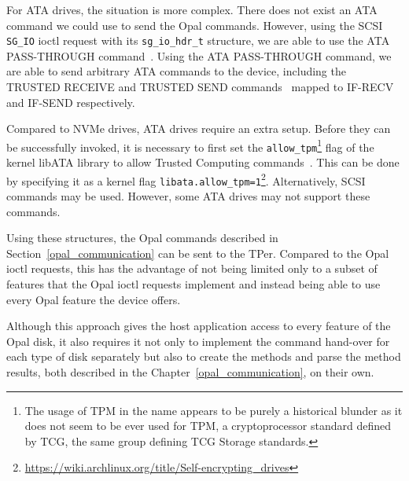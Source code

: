 For ATA drives, the situation is more complex. There does not exist an ATA command we could use to send the Opal commands.
However, using the SCSI \verb|SG_IO| ioctl request with its \verb|sg_io_hdr_t| structure, we are able to use the ATA PASS-THROUGH command~\cite{ata_passthrough}. Using the ATA PASS-THROUGH command, we are able to send arbitrary ATA commands to the device, including the TRUSTED RECEIVE and TRUSTED SEND commands~\cite{acs-3} mapped to IF-RECV and IF-SEND respectively.

Compared to NVMe drives, ATA drives require an extra setup. Before they can be successfully invoked,  it is necessary to first set the \verb|allow_tpm|\footnote{The usage of TPM in the name appears to be purely a historical blunder as it does not seem to be ever used for TPM, a cryptoprocessor standard defined by TCG, the same group defining TCG Storage standards.} flag of the kernel libATA library to allow Trusted Computing commands~\cite{acs-3}. This can be done by specifying it as a kernel flag \verb|libata.allow_tpm=1|\footnote{\url{https://wiki.archlinux.org/title/Self-encrypting_drives}}.
Alternatively, SCSI commands may be used. However, some ATA drives may not support these commands.






Using these structures, the Opal commands described in Section~\ref{opal_communication} can be sent to the TPer. Compared to the Opal ioctl requests, this has the advantage of not being limited only to a subset of features that the Opal ioctl requests implement and instead being able to use every Opal feature the device offers. %

Although this approach gives the host application access to every feature of the Opal disk, it also requires it not only to implement the command hand-over for each type of disk separately but also to create the methods and parse the method results, both described in the Chapter~\ref{opal_communication}, on their own.

